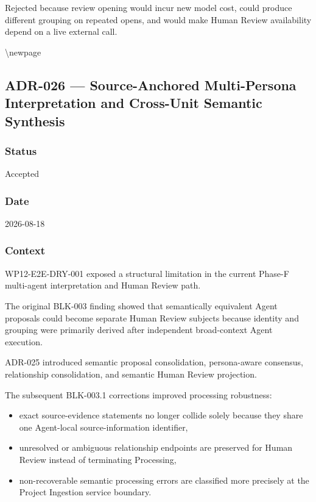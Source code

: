Rejected because review opening would incur new model cost, could produce different grouping on repeated opens, and would make Human Review availability depend on a live external call.

\textbackslash newpage

\hypertarget{adr-026--source-anchored-multi-persona-interpretation-and-cross-unit-semantic-synthesis}{%
\subsection{ADR-026 --- Source-Anchored Multi-Persona Interpretation and Cross-Unit Semantic Synthesis}\label{adr-026--source-anchored-multi-persona-interpretation-and-cross-unit-semantic-synthesis}}

\hypertarget{status-8}{%
\subsubsection{Status}\label{status-8}}

Accepted

\hypertarget{date-8}{%
\subsubsection{Date}\label{date-8}}

2026-08-18

\hypertarget{context-11}{%
\subsubsection{Context}\label{context-11}}

WP12-E2E-DRY-001 exposed a structural limitation in the current Phase-F multi-agent interpretation and Human Review path.

The original BLK-003 finding showed that semantically equivalent Agent proposals could become separate Human Review subjects because identity and grouping were primarily derived after independent broad-context Agent execution.

ADR-025 introduced semantic proposal consolidation, persona-aware consensus, relationship consolidation, and semantic Human Review projection.

The subsequent BLK-003.1 corrections improved processing robustness:

\begin{itemize}
\tightlist
\item
  exact source-evidence statements no longer collide solely because they share one Agent-local source-information identifier,
\item
  unresolved or ambiguous relationship endpoints are preserved for Human Review instead of terminating Processing,
\item
  non-recoverable semantic processing errors are classified more precisely at the Project Ingestion service boundary.
\end{itemize}

